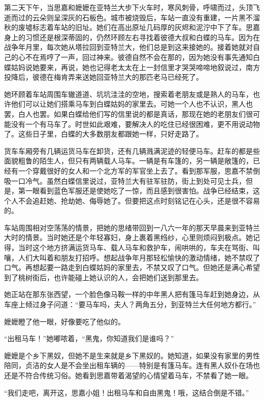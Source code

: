 \par 第二天下午，当思嘉和嬷嬷在亚特兰大步下火车时，寒风刺骨，呼啸而过，头顶飞逝而过的云朵则呈深灰的石板色。城市被烧毁后，车站一直没有重建，一片黑不溜秋的废墟标志着车站的旧址。她们在高出原址几码厚的灰烬和泥泞中下了车。思嘉身上的习惯还是根深蒂固的，仍然环顾左右寻找着彼德大叔和白蝶的马车。因为在战争年月里，每次她从塔拉回到亚特兰大，他们总是到这来接她的。接着她就对自己的心不在焉哼了一声，回过神来。彼德自然不会在那的，因为她没有事先通知白蝶姑妈说她要来，再说，她也记得老太太在上一封信里才哭哭啼啼地叙说过，南方投降后，彼德在梅肯弄来送她回亚特兰大的那匹老马已经死了。
\par 她环顾着车站周围车辙道道、坑坑洼洼的空地，搜索着老朋友或是熟人的马车，也许他们可以让她们搭乘马车到白蝶姑妈的家里去。可她一个人也不认识，黑人也罢，白人也罢。如果白蝶给他们写的信里说的都是真话，那现在她的老朋友们很可能没有一个有马车了。时世如此艰难，要解决人的吃住已经很困难，更不用说动物了。这些日子里，白蝶的大多数朋友都跟她一样，只好走路了。
\par 货车车厢旁有几辆运货马车在卸货，还有几辆溅满泥迹的轻便马车。赶车的都是些面貌粗鲁的陌生人，但只有两辆载人马车。一辆是有车篷的，另一辆是敞篷的，已经有一个穿戴很好的女人和一个北方军的军官坐上去了。看到那军服，思嘉不禁倒吸一口冷气。虽然白蝶信里说过，亚特兰大有驻军驻防，街上到处可见士兵，但是，第一眼看到蓝色军服还是使她吃了一惊，而且感到很害怕。战争已经结束，这个人不会追赶她、抢劫她、侮辱她了。但要把这点时刻铭记在心头，还是很不容易的。
\par 车站周围相对空荡荡的情景，把她的思绪带回到一八六一年的那天早晨来到亚特兰大时的情景。当时她还是个年轻寡妇，身上裹着黑绉纱，心里则烦闷到极点。她记得，当时这个地方挤满运货马车、载人马车和救护车，闹哄哄的，车夫在骂街、叫嚷，人们大叫着和朋友打招呼。想起战争年月那轻松愉快的激动情绪，她不禁叹了口气。再想起要一路走到白蝶姑妈的家里去，不禁又叹了口气。但她还是满心希望到了桃树街后，也许能碰上她认识的人，会把她们送到那里去。
\par 她正站在那东张西望，一个脸色像马鞍一样的中年黑人把有篷马车赶到她身边，从车座上倾过身子问道：“要马车吗，夫人？两角五分，到亚特兰大任何地方都行。”
\par 嬷嬷瞪了他一眼，好像要吃了他似的。
\par “出租马车！”她嘟哝着，“黑鬼，你知道我们是谁吗？”
\par 嬷嬷是个乡下黑奴，但她不是生来就是乡下黑奴的。她知道，如果没有家里的男性陪同，贞洁的女人是不会坐出租车辆的——特别是有篷马车。连有黑人奴仆在场也还是不符合传统习俗。她看到思嘉带着渴望的心情望着马车，不禁看了她一眼。
\par “我们走吧，离开这，思嘉小姐！出租马车和自由黑鬼！哦，这结合倒是不错。”
